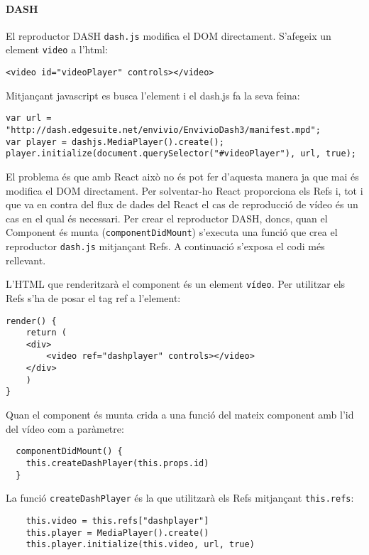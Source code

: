 \documentclass[12pt, titlepage]{article}
\begin{document}
\paragraph{DASH}

El reproductor DASH \verb|dash.js| modifica el DOM directament. S'afegeix un
element \verb|video| a l'html:

\begin{lstlisting}
<video id="videoPlayer" controls></video>
\end{lstlisting}

Mitjançant javascript es busca l'element i el dash.js fa la seva feina:

\begin{lstlisting}[breaklines]
var url = "http://dash.edgesuite.net/envivio/EnvivioDash3/manifest.mpd";
var player = dashjs.MediaPlayer().create();
player.initialize(document.querySelector("#videoPlayer"), url, true);
\end{lstlisting}

El problema és que amb React això no és pot fer d'aquesta manera ja que mai és
modifica el DOM directament. Per solventar-ho React proporciona els Refs i, tot
i que va en contra del flux de dades del React el cas de reproducció de vídeo és
un cas en el qual és necessari. Per crear el reproductor DASH, doncs, quan el
Component és munta (\verb|componentDidMount|) s'executa una funció que crea el
reproductor \verb|dash.js| mitjançant Refs. A continuació s'exposa el codi més
rellevant.

L'HTML que renderitzarà el component és un element \verb|vídeo|. Per utilitzar
els Refs s'ha de posar el tag ref a l'element:
\begin{lstlisting}
render() {
    return (
    <div>
        <video ref="dashplayer" controls></video>
    </div>
    )
}
\end{lstlisting}

Quan el component és munta crida a una funció del mateix component amb l'id del
vídeo com a paràmetre:

\begin{lstlisting}
  componentDidMount() {
    this.createDashPlayer(this.props.id)
  }
\end{lstlisting}

La funció \verb|createDashPlayer| és la que utilitzarà els Refs mitjançant
\verb|this.refs|:

\begin{lstlisting}
    this.video = this.refs["dashplayer"]
    this.player = MediaPlayer().create()
    this.player.initialize(this.video, url, true)
\end{lstlisting}
\end{document}
